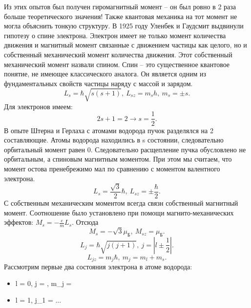 Из этих опытов был получен гиромагнитный момент -- он был ровно в 2 раза больше теоретического значения! Также квантовая механика на тот момент не могла объяснить тонкую структуру. В 1925 году Уленбек и Гаудсмит выдвинули гипотезу о спине электрона. Электрон имеет не только момент количества движения и магнитный момент связанные с движением частицы как целого, но и собственный механический момент количества движения. Этот собственный механический момент назвали спином. Спин -- это существенное квантовое понятие, не имеющее классического аналога. Он является одним из фундаментальных свойств частицы наряду с массой и зарядом. 
\[
    L_s = \hbar\sqrt{s(s+1)},\ L_{sz} = m_s h,\ m_s = \pm s.
\]
Для электронов имеем:
\[
    2s + 1 = 2 \rightarrow s = \frac{1}{2}.
\]
В опыте Штерна и Герлаха с атомами водорода пучок разделялся на 2 составляющие. Атомы водорода находились в s состоянии, следовательно орбитальный момент равен 0. Следовательно расщепление пучка обусловлено не орбитальным, а спиновым магнитным моментом. При этом мы считаем, что момент остова пренебрежимо мал по сравнению с моментом валентного электрона.
\[
    L_s = \frac{\sqrt{3}}{2}\hbar, \ L_{sz} = \pm\frac{\hbar}{2}.
\]
С собственным механическим моментом всегда связн собственный магнитный момент. Соотношение было установлено при помощи магнито-механических эффектов: \( M_s = -\frac{e}{m}L_s \). Отсюда
\[
    M_s = -\sqrt{3}\mu_\text{Б},\ M_{sz} = \mu_\text{Б}.
\]
\[
    L_j = \hbar\sqrt{j(j+1)},\ j = |l\pm\frac{1}{2}|.
\]
\[
    L_{jz} = m_j\hbar,\ m_j = m_l + m_s.
\]
Рассмотрим первые два состояния электрона в атоме водорода:
\begin{itemize}
\item l = 0, j = , m_j = \pm{}
\item l = 1, j_1 =  ...
\end{itemize}


